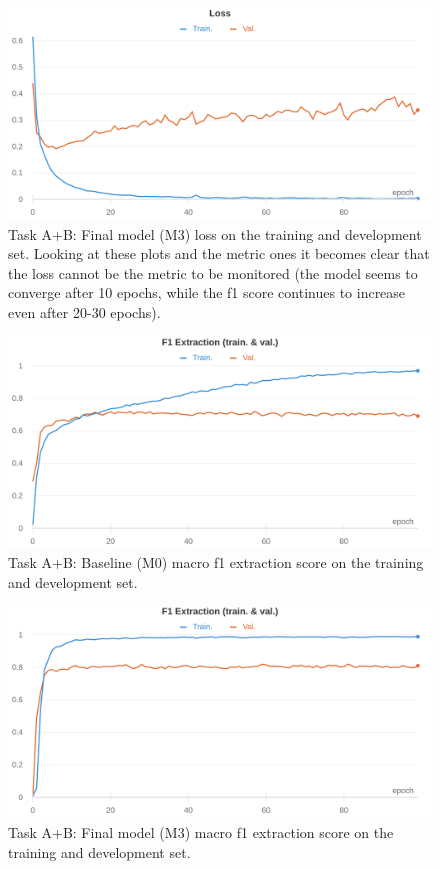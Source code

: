 \documentclass[11pt,a4paper]{article}
\begin{document}
	\begin{figure}[H]
		\centering
		\includegraphics[width=1\columnwidth]{M3_ab_loss.png}
		\caption{Task A+B: Final model (M3) loss on the training and development set. Looking at these plots and the metric ones it becomes clear that the loss cannot be the metric to be monitored (the model seems to converge after 10 epochs, while the f1 score continues to increase even after 20-30 epochs).}
		\label{fig:M3_loss}
	\end{figure}
	
	\begin{figure}[H]
		\centering
		\includegraphics[width=1\columnwidth]{M0_ab_f1_extr.png}
		\caption{Task A+B: Baseline (M0) macro f1 extraction score on the training and
			development set.}
		\label{fig:M0_extr}
	\end{figure}
	
	\begin{figure}[H]
		\centering
		\includegraphics[width=1\columnwidth]{M3_ab_f1_extr.png}
		\caption{Task A+B: Final model (M3) macro f1 extraction score on the training
			and development set.}
		\label{fig:M3_extr}
	\end{figure}
	
\end{document}
